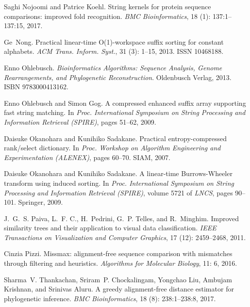 \documentclass{elsarticle}
\begin{document}
\begin{thebibliography}{35}
Saghi Nojoomi and Patrice Koehl.
\newblock String kernels for protein sequence comparisons: improved fold
  recognition.
\newblock \emph{{BMC} Bioinformatics}, 18 (1): 137:1--137:15,
  2017.

Ge~Nong.
\newblock Practical linear-time {O(1)}-workspace suffix sorting for constant
  alphabets.
\newblock \emph{ACM Trans. Inform. Syst.}, 31 (3): 1--15,
  2013.
\newblock ISSN 10468188.

Enno Ohlebusch.
\newblock \emph{Bioinformatics Algorithms: Sequence Analysis, Genome
  Rearrangements, and Phylogenetic Reconstruction}.
\newblock Oldenbusch Verlag, 2013.
\newblock ISBN 9783000413162.

Enno Ohlebusch and Simon Gog.
\newblock A compressed enhanced suffix array supporting fast string matching.
\newblock In \emph{Proc. International Symposium on String Processing and
  Information Retrieval (SPIRE)}, pages 51--62, 2009.

Daisuke Okanohara and Kunihiko Sadakane.
\newblock Practical entropy-compressed rank/select dictionary.
\newblock In \emph{Proc. Workshop on Algorithm Engineering and Experimentation
  (ALENEX)}, pages 60--70. {SIAM}, 2007.

Daisuke Okanohara and Kunihiko Sadakane.
\newblock A linear-time {Burrows-Wheeler} transform using induced sorting.
\newblock In \emph{Proc. International Symposium on String Processing and
  Information Retrieval (SPIRE)}, volume 5721 of \emph{LNCS}, pages 90--101.
  Springer, 2009.

J.~G.~S. Paiva, L.~F. C., H.~Pedrini, G.~P. Telles, and R.~Minghim.
\newblock Improved similarity trees and their application to visual data
  classification.
\newblock \emph{IEEE Transactions on Visualization and Computer Graphics},
  17 (12): 2459--2468, 2011.

Cinzia Pizzi.
\newblock Missmax: alignment-free sequence comparison with mismatches through
  filtering and heuristics.
\newblock \emph{Algorithms for Molecular Biology}, 11: 6, 2016.

Sharma~V. Thankachan, Sriram~P. Chockalingam, Yongchao Liu, Ambujam Krishnan,
  and Srinivas Aluru.
\newblock A greedy alignment-free distance estimator for phylogenetic
  inference.
\newblock \emph{{BMC} Bioinformatics}, 18 (8): 238:1--238:8,
  2017.


\end{thebibliography}
\end{document}
